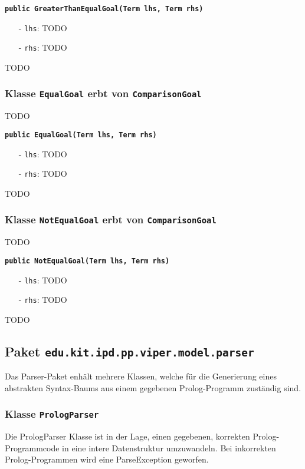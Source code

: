 \documentclass[parskip=full,11pt,twoside]{scrartcl}
\begin{document}
\textbf{\texttt{public GreaterThanEqualGoal(Term lhs, Term rhs)}}
\begin{itemize}[noitemsep]
	\item[-] \texttt{lhs}: TODO
	\item[-] \texttt{rhs}: TODO
\end{itemize}
TODO

\subsubsection{Klasse \texttt{EqualGoal} erbt von \texttt{ComparisonGoal}}
TODO

\textbf{\texttt{public EqualGoal(Term lhs, Term rhs)}}
\begin{itemize}[noitemsep]
	\item[-] \texttt{lhs}: TODO
	\item[-] \texttt{rhs}: TODO
\end{itemize}
TODO

\subsubsection{Klasse \texttt{NotEqualGoal} erbt von \texttt{ComparisonGoal}}
TODO

\textbf{\texttt{public NotEqualGoal(Term lhs, Term rhs)}}
\begin{itemize}[noitemsep]
	\item[-] \texttt{lhs}: TODO
	\item[-] \texttt{rhs}: TODO
\end{itemize}
TODO

\newpage
\subsection{Paket \texttt{edu.kit.ipd.pp.viper.model.parser}}

Das Parser-Paket enhält mehrere Klassen, welche für die Generierung eines abstrakten Syntax-Baums aus einem gegebenen Prolog-Programm zuständig sind.

\subsubsection{Klasse \texttt{PrologParser}}

Die PrologParser Klasse ist in der Lage, einen gegebenen, korrekten Prolog-Programmcode in eine intere Datenstruktur umzuwandeln. Bei inkorrekten Prolog-Programmen wird eine ParseException geworfen.
\end{document}
